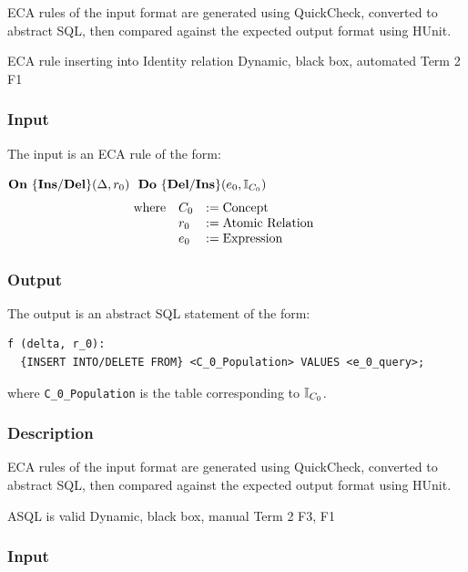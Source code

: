 \documentclass[12pt]{report}
\begin{document}
ECA rules of the input format are generated using QuickCheck, converted to
  abstract SQL, then compared against the expected output format using HUnit.


{ECA rule inserting into Identity relation} 
{Dynamic, black box, automated}  
{Term 2}
{F1}
\vspace{-12pt}\subsubsection*{Input}
The input is an ECA rule of the form:

$\mathbf{On~} \mathbf{\{Ins/Del\}}(\Delta,r_0) \,\,\,\,\mathbf{Do~} \mathbf{\{Del/Ins\}}(e_0,\mathbb{I}_{C_0}) $
\vspace{-10pt}\[\hspace{-20pt}\begin{array}{lll}
\text{where} & C_0 & := \text{Concept} \\ 
             & r_0 & := \text{Atomic Relation}\\ 
             & e_0 & := \text{Expression}\\ 
\end{array}\]

\vspace{-12pt}\subsubsection*{Output}

The output is an abstract SQL statement of the form:
\begin{verbatim}
f (delta, r_0):
  {INSERT INTO/DELETE FROM} <C_0_Population> VALUES <e_0_query>;
\end{verbatim}

\noindent where \verb|C_0_Population| is the table corresponding to $\mathbb{I}_{C_0}$. 

\vspace{-12pt}\subsubsection*{Description}

ECA rules of the input format are generated using QuickCheck, converted to
  abstract SQL, then compared against the expected output format using HUnit.


{ASQL is valid} 
{Dynamic, black box, manual}  
{Term 2}
{F3, F1}
\vspace{-12pt}\subsubsection*{Input} 
\end{document}
